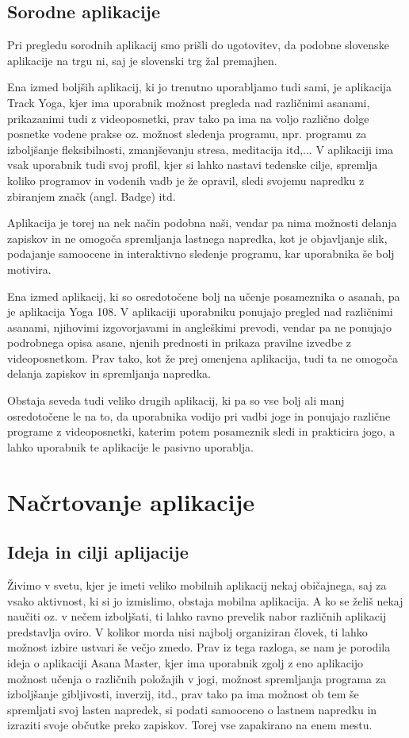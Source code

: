 \documentclass[a4paper, 12pt]{book}
\begin{document}
\section{Sorodne aplikacije}
Pri pregledu sorodnih aplikacij smo prišli do ugotovitev, da podobne slovenske aplikacije na trgu ni, saj je slovenski trg žal premajhen.

Ena izmed boljših aplikacij, ki jo trenutno uporabljamo tudi sami, je aplikacija Track Yoga, kjer ima uporabnik možnost pregleda nad različnimi asanami, prikazanimi tudi z videoposnetki, prav tako pa ima na voljo različno dolge posnetke vodene prakse oz. možnost sledenja programu, npr. programu za izboljšanje fleksibilnosti, zmanjševanju stresa, meditacija itd,... V aplikaciji ima vsak uporabnik tudi svoj profil, kjer si lahko nastavi tedenske cilje, spremlja koliko programov in vodenih vadb je že opravil, sledi svojemu napredku z zbiranjem značk (angl. Badge) itd. 

Aplikacija je torej na nek način podobna naši, vendar pa nima možnosti delanja zapiskov in ne omogoča spremljanja lastnega napredka, kot je objavljanje slik, podajanje samoocene in interaktivno sledenje programu, kar uporabnika še bolj motivira.

Ena izmed aplikacij, ki so osredotočene bolj na učenje posameznika o asanah, pa je aplikacija Yoga 108. V aplikaciji uporabniku ponujajo pregled nad različnimi asanami, njihovimi izgovorjavami in angleškimi prevodi, vendar pa ne ponujajo podrobnega opisa asane, njenih prednosti in prikaza pravilne izvedbe z videoposnetkom. 
Prav tako, kot že prej omenjena aplikacija, tudi ta ne omogoča delanja zapiskov in spremljanja napredka.

Obstaja seveda tudi veliko drugih aplikacij, ki pa so vse bolj ali manj osredotočene le na to, da uporabnika vodijo pri vadbi joge in ponujajo različne programe z videoposnetki, katerim potem posameznik sledi in prakticira jogo, a lahko uporabnik te aplikacije le pasivno uporablja.


\chapter{Načrtovanje aplikacije}
\label{ch1}

\section{Ideja in cilji aplijacije}
Živimo v svetu, kjer je imeti veliko mobilnih aplikacij nekaj običajnega, saj za vsako aktivnost, ki si jo izmislimo, obstaja mobilna aplikacija. A ko se želiš nekaj naučiti oz. v nečem izboljšati, ti lahko ravno prevelik nabor različnih aplikacij predstavlja oviro. V kolikor morda nisi najbolj organiziran človek, ti lahko možnost izbire ustvari še večjo zmedo. Prav iz tega razloga, se nam je porodila ideja o aplikaciji Asana Master, kjer ima uporabnik zgolj z eno aplikacijo možnost učenja o različnih položajih v jogi, možnost spremljanja programa za izboljšanje gibljivosti, inverzij, itd., prav tako pa ima možnost ob tem še spremljati svoj lasten napredek, si podati samooceno o lastnem napredku in izraziti svoje občutke preko zapiskov. Torej vse zapakirano na enem mestu.
\end{document}
